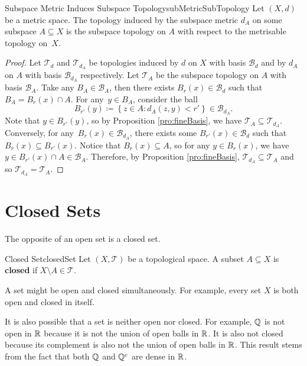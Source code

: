 \documentclass[math]{amznotes}
\theoremstyle{remark}
\begin{document}
\begin{probox}{Subspace Metric Induces Subspace Topology}{subMetricSubTopology}
    Let $\left(X, d\right)$ be a metric space. The topology induced by the subspace metric $d_A$ on some subspace $A \subseteq X$ is the subspace topology on $A$ with respect to the metrisable topology on~$X$.
    \tcblower
    \begin{proof}
        Let $\mathcal{T}_d$ and $\mathcal{T}_{d_A}$ be topologies induced by $d$ on $X$ with basis $\mathcal{B}_d$ and by $d_A$ on $A$ with basis $\mathcal{B}_{d_A}$ respectively. Let $\mathcal{T}_A$ be the subspace topology on $A$ with basis $\mathcal{B}_A$. Take any $B_A \in \mathcal{B}_A$, then there exists $B_r\left(x\right) \in \mathcal{B}_d$ such that $B_A = B_r\left(x\right) \cap A$. For any~$y \in B_A$, consider the ball 
        \begin{equation*}
            B_{r'}\left(y\right) \coloneqq \left\{z \in A \colon d_A\left(z, y\right) < r'\right\} \in \mathcal{B}_{d_A}.
        \end{equation*}
        Note that $y \in B_{r'}\left(y\right)$, so by Proposition \ref{pro:fineBasis}, we have $\mathcal{T}_A \subseteq \mathcal{T}_{d_A}$. Conversely, for any~$B_r\left(x\right) \in \mathcal{B}_{d_A}$, there exists some $B_{r'}\left(x\right) \in \mathcal{B}_d$ such that $B_r\left(x\right) \subseteq B_{r'}\left(x\right)$. Notice that $B_r\left(x\right) \subseteq A$, so for any $y \in B_r\left(x\right)$, we have $y \in B_{r'}\left(x\right) \cap A \in \mathcal{B}_A$. Therefore, by Proposition \ref{pro:fineBasis}, $\mathcal{T}_{d_A} \subseteq \mathcal{T}_A$ and so $\mathcal{T}_{d_A} = \mathcal{T}_A$.
    \end{proof}
\end{probox}
\section{Closed Sets}
The opposite of an open set is a closed set.
\begin{dfnbox}{Closed Set}{closedSet}
    Let $\left(X, \mathcal{T}\right)$ be a topological space. A subset $A \subseteq X$ is {\color{red} \textbf{closed}} if $X \setminus A \in \mathcal{T}$.
\end{dfnbox}
A set might be open and closed simultaneously. For example, every set $X$ is both open and closed in itself. 

It is also possible that a set is neither open nor closed. For example, $\mathbb{Q}$ is not open in $\mathbb{R}$ because it is not the union of open balls in $\mathbb{R}$. It is also not closed because its complement is also not the union of open balls in $\mathbb{R}$. This result stems from the fact that both $\mathbb{Q}$ and $\mathbb{Q}^c$ are dense in $\mathbb{R}$.
\end{document}
